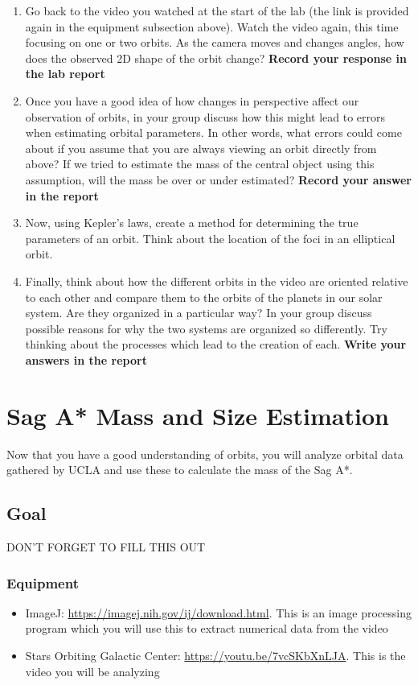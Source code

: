 \begin{enumerate}
	\item Go back to the video you watched at the start of the lab (the link is provided again in the equipment subsection above). Watch the video again, this time focusing on one or two orbits. As the camera moves and changes angles, how does the observed 2D shape of the orbit change? \textbf{Record your response in the lab report}
	
	\item Once you have a good idea of how changes in perspective affect our observation of orbits, in your group discuss how this might lead to errors when estimating orbital parameters. In other words, what errors could come about if you assume that you are always viewing an orbit directly from above? If we tried to estimate the mass of the central object using this assumption, will the mass be over or under estimated? \textbf{Record your answer in the report}
	
	\item Now, using Kepler's laws, create a method for determining the true parameters of an orbit. Think about the location of the foci in an elliptical orbit. 
	
	\item Finally, think about how the different orbits in the video are oriented relative to each other and compare them to the orbits of the planets in our solar system. Are they organized in a particular way? In your group discuss possible reasons for why the two systems are organized so differently. Try thinking about the processes which lead to the creation of each. \textbf{Write your answers in the report}
\end{enumerate}

\section{Sag A* Mass and Size Estimation}
Now that you have a good understanding of orbits, you will analyze orbital data gathered by UCLA and use these to calculate the mass of the Sag A*.

\subsection{Goal}

DON'T FORGET TO FILL THIS OUT

\subsubsection{Equipment}
\begin{itemize}
	\item ImageJ: \url{https://imagej.nih.gov/ij/download.html}. This is an image processing program which you will use this to extract numerical data from the video
	\item Stars Orbiting Galactic Center: \url{https://youtu.be/7vcSKbXnLJA}. This is the video you will be analyzing
\end{itemize}

